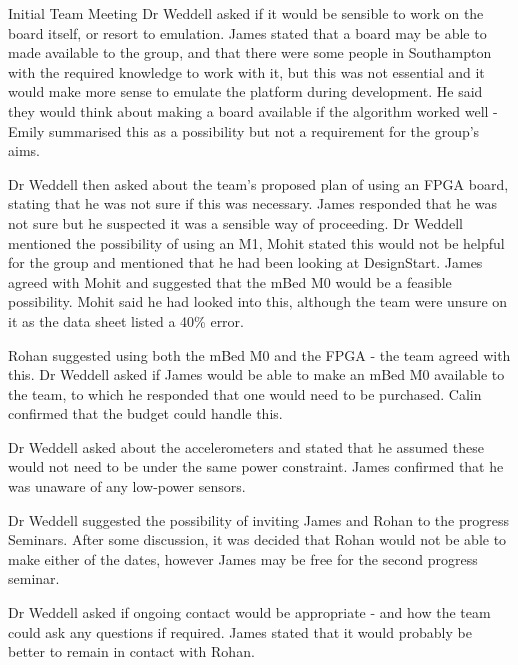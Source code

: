 \documentclass{article}
\begin{document}
\begin{Minutes}{Initial Team Meeting}
Dr Weddell asked if it would be sensible to work on the board itself, or resort to emulation. James
stated that a board may be able to made available to the group, and that there were some people in
Southampton with the required knowledge to work with it, but this was not essential and it would
make more sense to emulate the platform during development. He said they would think about making a
board available if the algorithm worked well - Emily summarised this as a possibility but not a
requirement for the group's aims.

Dr Weddell then asked about the team's proposed plan of using an FPGA board, stating that he was not
sure if this was necessary. James responded that he was not sure but he suspected it was a sensible
way of proceeding. Dr Weddell mentioned the possibility of using an M1, Mohit stated this would not
be helpful for the group and mentioned that he had been looking at DesignStart. James agreed with
Mohit and suggested that the mBed M0 would be a feasible possibility. Mohit said he had looked into
this, although the team were unsure on it as the data sheet listed a 40\% error.

Rohan suggested using both the mBed M0 and the FPGA - the team agreed with this. Dr Weddell asked if
James would be able to make an mBed M0 available to the team, to which he responded that one would
need to be purchased. Calin confirmed that the budget could handle this.


Dr Weddell asked about the accelerometers and stated that he assumed these would not need to be under
the same power constraint. James confirmed that he was unaware of any low-power sensors.

Dr Weddell suggested the possibility of inviting James and Rohan to the progress Seminars. After some
discussion, it was decided that Rohan would not be able to make either of the dates, however James
may be free for the second progress seminar.

Dr Weddell asked if ongoing contact would be appropriate - and how the team could ask any questions if
required. James stated that it would probably be better to remain in contact with Rohan.


\end{Minutes}
\end{document}
